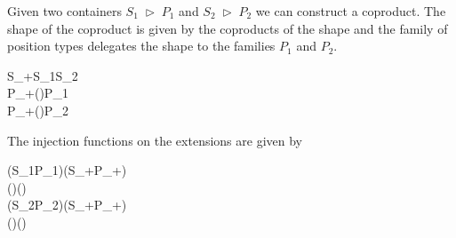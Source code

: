 Given two containers \ensuremath{S_1{\;\triangleright\;}P_1} and \ensuremath{S_2{\;\triangleright\;}P_2} we can construct a
coproduct. The shape of the coproduct is given by the coproducts of
the shape and the family of position types delegates the shape to the
families \ensuremath{P_1} and \ensuremath{P_2}.
\begin{hscode}\SaveRestoreHook
{}%
%
%
%
\>[3]{}\;S_{+}\mathrel{=}\;S_1\;S_2{}\<[E]%
\\
\>[3]{}\;P_{+}\;(\;){}\<[25]%
\>[25]{}\mathrel{=}P_1\;\<[E]%
\\
\>[3]{}\;P_{+}\;(\;){}\<[25]%
\>[25]{}\mathrel{=}P_2\;\<[E]%
\ColumnHook
\end{hscode}\resethooks
The injection functions on the extensions are given by
\begin{hscode}\SaveRestoreHook
{}%
%
%
\>[3]{}\mathbin{::}\;(S_1{\;\triangleright\;}P_1)\to {}\;(S_{+}{\;\triangleright\;}P_{+}){}\<[E]%
\\
\>[3]{}\;(\;\;)\mathrel{=}\;(\;)\;\<[E]%
\\
\>[3]{}\mathbin{::}\;(S_2{\;\triangleright\;}P_2)\to {}\;(S_{+}{\;\triangleright\;}P_{+}){}\<[E]%
\\
\>[3]{}\;(\;\;)\mathrel{=}\;(\;)\;\<[E]%
\ColumnHook
\end{hscode}\resethooks

